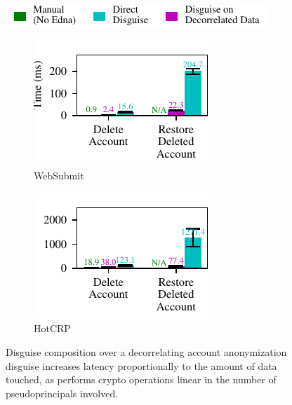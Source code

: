 \begin{figure}[t]
    \centering
    \includegraphics{figs/composition_legend}
    \begin{subfigure}[b]{0.49\columnwidth}
        \includegraphics{figs/composition_stats_websubmit}
        \caption{WebSubmit}
        \label{f:comp-websubmit}
      \end{subfigure}
      \begin{subfigure}[b]{0.49\columnwidth}
        \includegraphics{figs/composition_stats_hotcrp}
          \caption{HotCRP}
        \label{f:comp-hotcrp}
      \end{subfigure}
    \caption{Disguise composition over a decorrelating account
      anonymization disguise increases latency proportionally
      to the amount of data touched, as \sys performs
      crypto operations linear in the number of pseudoprincipals
      involved.}
    \label{f:composition}
\end{figure}

